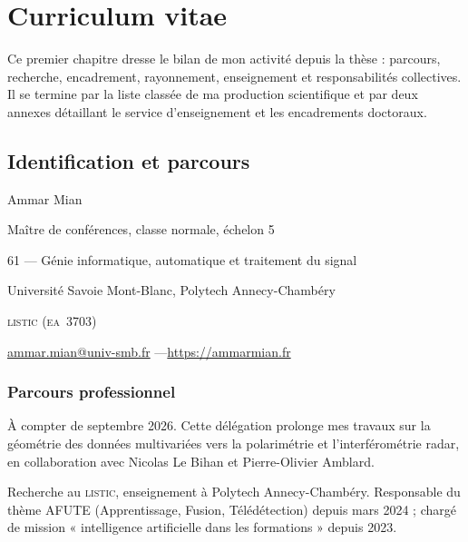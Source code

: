 \chapter{Curriculum vitae}
\label{ch:cv}

Ce premier chapitre dresse le bilan de mon activité depuis la thèse : parcours,
recherche, encadrement, rayonnement, enseignement et responsabilités
collectives. Il se termine par la liste classée de ma production scientifique et
par deux annexes détaillant le service d'enseignement et les encadrements
doctoraux.



\section{Identification et parcours}
\label{sec:cv-identification}

\begin{cvfields}
  \item[Nom] Ammar Mian
  \item[Corps] Maître de conférences, classe normale, échelon 5
  \item[Section \textsc{cnu}] 61 --- Génie informatique, automatique et
    traitement du signal
  \item[Établissement] Université Savoie Mont-Blanc, Polytech Annecy-Chambéry
  \item[Laboratoire] \textsc{listic} (\textsc{ea}~3703)
  \item[Contact] \href{mailto:ammar.mian@univ-smb.fr}{ammar.mian@univ-smb.fr}
    \quad ---\quad \url{https://ammarmian.fr}
\end{cvfields}


\subsection{Parcours professionnel}
\label{subsec:cv-carriere}

À compter de septembre 2026. Cette délégation prolonge mes travaux sur la
géométrie des données multivariées vers la polarimétrie et l'interférométrie
radar, en collaboration avec Nicolas Le Bihan et Pierre-Olivier Amblard.

Recherche au \textsc{listic}, enseignement à Polytech Annecy-Chambéry.
Responsable du thème AFUTE (Apprentissage, Fusion, Télédétection)
depuis mars 2024 ; chargé de mission « intelligence artificielle dans les
formations » depuis 2023.


